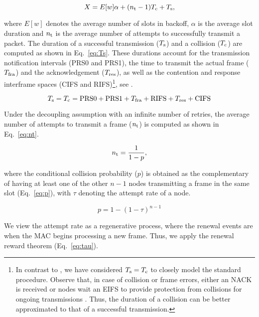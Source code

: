 \documentclass[preprint,12pt]{elsarticle}
\def\PRSzero    {\mbox{\rm PRS0}}
\def\PRSone    {\mbox{\rm PRS1}}
\def\RIFS    {\mbox{\rm RIFS}}
\def\CIFS    {\mbox{\rm CIFS}}
\begin{document}
\begin{equation}\label{eq:service_time}
X=E[w]\alpha + (n_{\rm t}-1) T_{\rm c} + T_{\rm s},
\end{equation}

where $E[w]$ denotes the average number of slots in backoff, $\alpha$ is the average slot duration and $n_{\rm t}$ is the average number of attempts to successfully transmit a packet. The duration of a successful transmission ($T_{\rm s}$) and a collision ($T_{\rm c}$) are computed as shown in Eq.~\ref{eq:Ts}. These durations account for the transmission notification intervals (PRS0 and PRS1), the time to transmit the actual frame ($T_{\rm fra}$) and the acknowledgement ($T_{\rm res}$), as well as the contention and response interframe spaces (CIFS and RIFS)\footnote{In contrast to \cite{chung2006performance}, we have considered $T_{\rm s} = T_{\rm c}$ to closely model the standard procedure. Observe that, in case of collision or frame errors, either an NACK is received or nodes wait an EIFS to provide protection from collisions for ongoing transmissions \cite{HomeplugStd}. Thus, the duration of a collision can be better approximated to that of a successful transmission.}, see \cite{HomeplugStd}.

\begin{equation}\label{eq:Ts}
T_{\rm s} = T_{\rm c} = \PRSzero + \PRSone + T_{\rm fra} + \RIFS + T_{\rm res} + \CIFS
\end{equation}

Under the decoupling assumption with an infinite number of retries, the average number of attempts to transmit a frame ($n_{\rm t}$) is computed as shown in Eq.~\ref{eq:nt}.

\begin{equation}\label{eq:nt}
 n_{\rm t}=\frac{1}{1-p},
\end{equation}

where the conditional collision probability ($p$) is obtained as the complementary of having at least one of the other $n-1$ nodes transmitting a frame in the same slot (Eq.~\ref{eq:p}), with $\tau$ denoting the attempt rate of a node. 

\begin{equation}\label{eq:p}
 p=1-(1-\tau)^{n-1}
\end{equation}

We view the attempt rate as a regenerative process, where the renewal events are when the MAC begins processing a new frame. Thus, we apply the renewal reward theorem (Eq.~\ref{eq:tau}). 
\end{document}
